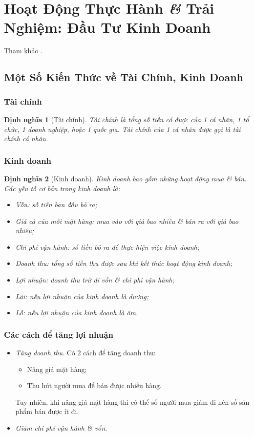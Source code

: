 \documentclass[oneside]{book}
\numberwithin{equation}{section}
\newtheorem{dinhnghia}{Định nghĩa}[section]
\begin{document}
\section{Hoạt Động Thực Hành \textit{\&} Trải Nghiệm: Đầu Tư Kinh Doanh}
Tham khảo \cite[pp. 89--92]{Thai_Anh_Dat_Ha_Loan_Nam_Quang_Toan_6_tap_1}.

\subsection{Một Số Kiến Thức về Tài Chính, Kinh Doanh}

\subsubsection{Tài chính}
\begin{dinhnghia}[Tài chính]
	\emph{Tài chính} là tổng số tiền có được của 1 cá nhân, 1 tổ chức, 1 doanh nghiệp, hoặc 1 quốc gia. Tài chính của 1 cá nhân được gọi là \emph{tài chính cá nhân}.
\end{dinhnghia}

\subsubsection{Kinh doanh}
\begin{dinhnghia}[Kinh doanh]
	\emph{Kinh doanh} bao gồm những hoạt động mua \textit{\&} bán. Các yếu tố cơ bản trong kinh doanh là:
	\begin{itemize}
		\item \emph{Vốn:} số tiền ban đầu bỏ ra;
		\item \emph{Giá cả của mỗi mặt hàng:} mua vào với giá bao nhiêu \textit{\&} bán ra với giá bao nhiêu;
		\item \emph{Chi phí vận hành:} số tiền bỏ ra để thực hiện việc kinh doanh;
		\item \emph{Doanh thu:} tổng số tiền thu được sau khi kết thúc hoạt động kinh doanh;
		\item \emph{Lợi nhuận:} doanh thu trừ đi vốn \textit{\&} chi phí vận hành;
		\item \emph{Lãi:} nếu lợi nhuận của kinh doanh là dương;
		\item \emph{Lỗ:} nếu lợi nhuận của kinh doanh là âm.
	\end{itemize}
\end{dinhnghia}

\subsubsection{Các cách để tăng lợi nhuận}
\begin{itemize}
	\item \textit{Tăng doanh thu}. Có 2 cách để tăng doanh thu:
	\begin{itemize}
		\item Nâng giá mặt hàng;
		\item Thu hút người mua để bán được nhiều hàng.
	\end{itemize}
	Tuy nhiên, khi nâng giá mặt hàng thì có thể số người mua giảm đi nên số sản phẩm bán được ít đi.
	\item \textit{Giảm chi phí vận hành \textit{\&} vốn}.
\end{itemize}
\end{document}

